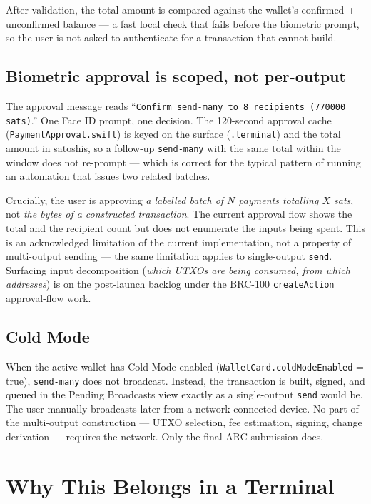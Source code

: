 \documentclass[a4paper, 11pt]{article}
\begin{document}
After validation, the total amount is compared against the wallet's confirmed + unconfirmed balance --- a fast local check that fails before the biometric prompt, so the user is not asked to authenticate for a transaction that cannot build.

\subsection{Biometric approval is scoped, not per-output}

The approval message reads ``\texttt{Confirm send-many to 8 recipients (770000 sats)}.'' One Face ID prompt, one decision. The 120-second approval cache (\texttt{PaymentApproval.swift}) is keyed on the surface (\texttt{.terminal}) and the total amount in satoshis, so a follow-up \texttt{send-many} with the same total within the window does not re-prompt --- which is correct for the typical pattern of running an automation that issues two related batches.

Crucially, the user is approving \emph{a labelled batch of $N$ payments totalling $X$ sats}, not \emph{the bytes of a constructed transaction}. The current approval flow shows the total and the recipient count but does not enumerate the inputs being spent. This is an acknowledged limitation of the current implementation, not a property of multi-output sending --- the same limitation applies to single-output \texttt{send}. Surfacing input decomposition (\emph{which UTXOs are being consumed, from which addresses}) is on the post-launch backlog under the BRC-100 \texttt{createAction} approval-flow work.

\subsection{Cold Mode}

When the active wallet has Cold Mode enabled (\texttt{WalletCard.coldModeEnabled} = true), \texttt{send-many} does not broadcast. Instead, the transaction is built, signed, and queued in the Pending Broadcasts view exactly as a single-output \texttt{send} would be. The user manually broadcasts later from a network-connected device. No part of the multi-output construction --- UTXO selection, fee estimation, signing, change derivation --- requires the network. Only the final ARC submission does.

\section{Why This Belongs in a Terminal}
\end{document}
